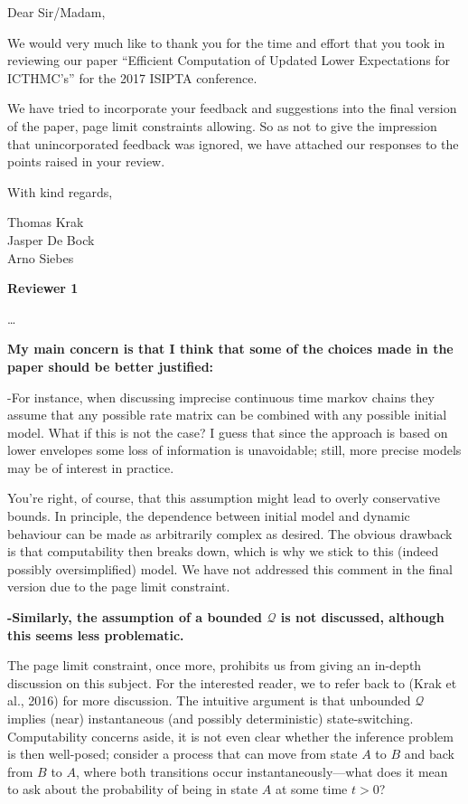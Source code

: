 \documentclass[twoside,11pt]{letter}
\begin{document}
Dear Sir/Madam,

We would very much like to thank you for the time and effort that you took in reviewing our paper ``Efficient Computation of Updated Lower Expectations for ICTHMC's'' for the 2017 ISIPTA conference.

We have tried to incorporate your feedback and suggestions into the final version of the paper, page limit constraints allowing. So as not to give the impression that unincorporated feedback was ignored, we have attached our responses to the points raised in your review.

With kind regards,

Thomas Krak\\
Jasper De Bock\\
Arno Siebes
\newline\newline

\newpage
{\bf Reviewer 1}

\ldots~
{\bf 
My main concern is that I think that some of the choices made in the paper should be better justified: 

-For instance, when discussing imprecise continuous time markov chains they assume that any possible rate matrix can be combined with any possible initial model. What if this is not the case? I guess that since the approach is based on lower envelopes some loss of information is unavoidable; still, more precise models may be of interest in practice. }

You're right, of course, that this assumption might lead to overly conservative bounds. In principle, the dependence between initial model and dynamic behaviour can be made as arbitrarily complex as desired. The obvious drawback is that computability then breaks down, which is why we stick to this (indeed possibly oversimplified) model. We have not addressed this comment in the final version due to the page limit constraint.

{\bf 
-Similarly, the assumption of a bounded $\mathcal{Q}$ is not discussed, although this seems less problematic. }

The page limit constraint, once more, prohibits us from giving an in-depth discussion on this subject. For the interested reader, we to refer back to (Krak et al., 2016) for more discussion. The intuitive argument is that unbounded $\mathcal{Q}$ implies (near) instantaneous (and possibly deterministic) state-switching. Computability concerns aside, it is not even clear whether the inference problem is then well-posed; consider a process that can move from state $A$ to $B$ and back from $B$ to $A$, where both transitions occur instantaneously---what does it mean to ask about the probability of being in state $A$ at some time $t>0$?
\end{document}
